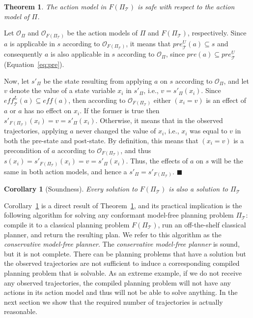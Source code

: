 \documentclass{article}
\newtheorem{corollary}{Corollary}
\newenvironment{proof}{\noindent{\bf Proof:~~}}{\qed}
\newcommand{\qed}{\hfill\ensuremath{\blacksquare}}
\newcommand{\cmfp}{conformant model-free planning}
\newcommand{\eff}{\textit{eff}}
\newcommand{\pre}{\textit{pre}}
\newtheorem{theorem}{Theorem}
\newcommand{\roni}[1]{[[Roni:#1]]}
\begin{document}
	\begin{theorem}
		The action model in $F(\Pi_\mathcal{T})$ 
		is safe with respect to the action model of $\Pi$. 
		\label{the:safeness}
	\end{theorem}
	\begin{proof}
		Let $\mathcal{O}_\Pi$ and $\mathcal{O}_{F(\Pi_\mathcal{T})}$ be the action models of $\Pi$ and $F(\Pi_\mathcal{T})$, respectively. 
		Since $a$ is applicable in $s$ according to $\mathcal{O}_{F(\Pi_\mathcal{T})}$, it means that $\pre_\mathcal{T}^U(a)\subseteq s$ and consequently  $a$ is also applicable in $s$ according to $\mathcal{O}_\Pi$, since $\pre(a)\subseteq \pre_\mathcal{T}^U$ (Equation~\ref{eq:pre}). 
		
		
		Now, let $s'_\Pi$ be the state resulting from applying $a$ on $s$ according to $\mathcal{O}_\Pi$, and let $v$ denote the value of a state variable $x_i$ in $s'_\Pi$, i.e., $v=s'_\Pi(x_i)$. 
		Since $\eff_\mathcal{T}^L(a)\subseteq \eff(a)$, 
		then according to $\mathcal{O}_{F(\Pi_\mathcal{T})}$ 
		either $(x_i=v)$ is an effect of $a$ 
		or $a$ has no effect on $x_i$. 
		If the former is true then $s'_{F(\Pi_{\mathcal{T}})}(x_i)=v=s'_\Pi(x_i)$. 
		Otherwise, it means that in the observed trajectories, applying $a$ 
		never changed the value of $x_i$, i.e., $x_i$ was equal to $v$ in both the pre-state and post-state. By definition, this means that $(x_i=v)$ is a precondition of $a$ 
		according to $\mathcal{O}_{F(\Pi_\mathcal{T})}$, 
		and thus $s(x_i)=s'_{F(\Pi_\mathcal{T})}(x_i)=v=s'_\Pi(x_i)$. 
		Thus, the effects of $a$ on $s$ will be the same in both action models, and hence a 
		$s'_\Pi=s'_{F(\Pi_\mathcal{T})}$. 
	\end{proof}
	\begin{corollary}[Soundness]
		Every solution to $F(\Pi_\mathcal{T})$ is also a solution to $\Pi_\mathcal{T}$
		\label{the:soundness}
	\end{corollary}
	Corollary~\ref{the:soundness} is a direct result of Theorem~\ref{the:safeness}, 
	and its practical implication is the following algorithm for solving 
	any \cmfp{} problem $\Pi_\mathcal{T}$: compile it to a classical planning problem 
	$F(\Pi_\mathcal{T})$, run an off-the-shelf classical planner, and return the resulting plan. 
	We refer to this algorithm as the {\em conservative model-free planner}. 	
	The {\em conservative model-free planner} is sound, but it is not complete. 
	There can be planning problems 
	that have a solution but the observed trajectories are not sufficient 
	to induce a corresponding compiled planning problem that is solvable. 
	As an extreme example, if we do not receive any observed trajectories, 
	the compiled planning problem will not have any actions in its action model
	and thus will not be able to solve anything. 
	In the next section we show that the required number of trajectories is actually reasonable. 
	
\end{document}
